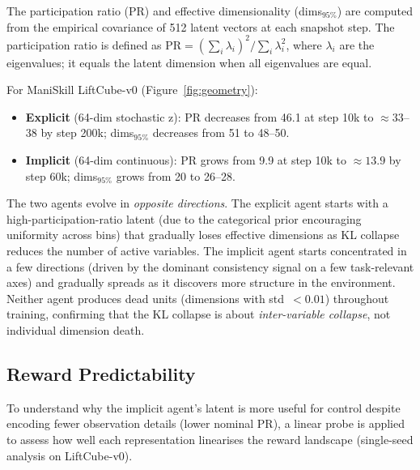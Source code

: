 \documentclass{article}
\begin{document}
The participation ratio (PR) and effective dimensionality (dims$_{95\%}$) are computed
from the empirical covariance of 512 latent vectors at each snapshot step.
The participation ratio is defined as $\mathrm{PR} = (\sum_i \lambda_i)^2 / \sum_i
\lambda_i^2$, where $\lambda_i$ are the eigenvalues; it equals the latent dimension
when all eigenvalues are equal.

For ManiSkill LiftCube-v0 (Figure~\ref{fig:geometry}):
\begin{itemize}[nosep,leftmargin=1em]
  \item \textbf{Explicit} (64-dim stochastic z): PR decreases from 46.1 at step 10k to
        $\approx 33$--$38$ by step 200k; dims$_{95\%}$ decreases from 51 to 48--50.
  \item \textbf{Implicit} (64-dim continuous): PR grows from 9.9 at step 10k to
        $\approx 13.9$ by step 60k; dims$_{95\%}$ grows from 20 to 26--28.
\end{itemize}

The two agents evolve in \emph{opposite directions}.
The explicit agent starts with a high-participation-ratio latent (due to the categorical
prior encouraging uniformity across bins) that gradually loses effective dimensions as
KL collapse reduces the number of active variables.
The implicit agent starts concentrated in a few directions (driven by the dominant
consistency signal on a few task-relevant axes) and gradually spreads as it discovers
more structure in the environment.
Neither agent produces dead units (dimensions with std~$< 0.01$) throughout training,
confirming that the KL collapse is about \emph{inter-variable collapse}, not individual
dimension death.

\subsection{Reward Predictability}
\label{sec:reward_probe}

To understand why the implicit agent's latent is more useful for control despite
encoding fewer observation details (lower nominal PR), a linear probe is applied to
assess how well each representation linearises the reward landscape (single-seed
analysis on LiftCube-v0).
\end{document}
